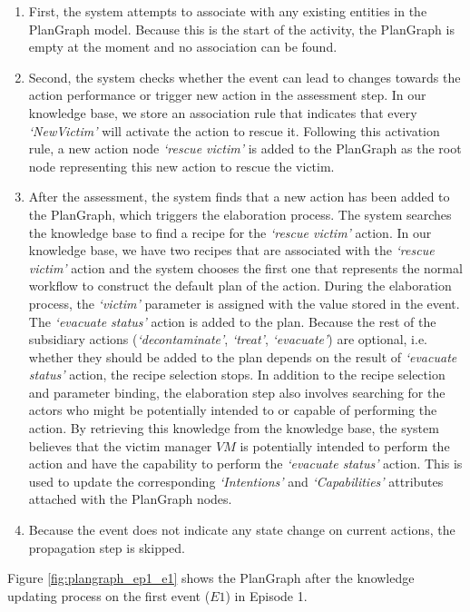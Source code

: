 \begin{enumerate}
	\item First, the system attempts to associate with any existing entities in the PlanGraph model. Because this is the start of the activity, the PlanGraph is empty at the moment and no association can be found.
	\item Second, the system checks whether the event can lead to changes towards the action performance or trigger new action in the assessment step. In our knowledge base, we store an association rule that indicates that every \emph{`NewVictim'} will activate the action to rescue it. Following this activation rule, a new action node \emph{`rescue victim'} is added to the PlanGraph as the root node representing this new action to rescue the victim.
	\item After the assessment, the system finds that a new action has been added to the PlanGraph, which triggers the elaboration process. The system searches the knowledge base to find a recipe for the \emph{`rescue victim'} action. In our knowledge base, we have two recipes that are associated with the \emph{`rescue victim'} action and the system chooses the first one that represents the normal workflow to construct the default plan of the action. During the elaboration process, the \emph{`victim'} parameter is assigned with the value stored in the event. The \emph{`evacuate status'} action is added to the plan. Because the rest of the subsidiary actions (\emph{`decontaminate'}, \emph{`treat'}, \emph{`evacuate'}) are optional, i.e. whether they should be added to the plan depends on the result of \emph{`evacuate status'} action, the recipe selection stops. In addition to the recipe selection and parameter binding, the elaboration step also involves searching for the actors who might be potentially intended to or capable of performing the action. By retrieving this knowledge from the knowledge base, the system believes that the victim manager $VM$ is potentially intended to perform the action and have the capability to perform the \emph{`evacuate status'} action. This is used to update the corresponding \emph{`Intentions'} and \emph{`Capabilities'} attributes attached with the PlanGraph nodes.
	\item Because the event does not indicate any state change on current actions, the propagation step is skipped.
\end{enumerate}

Figure \ref{fig:plangraph_ep1_e1} shows the PlanGraph after the knowledge updating process on the first event ($E1$) in Episode 1.


